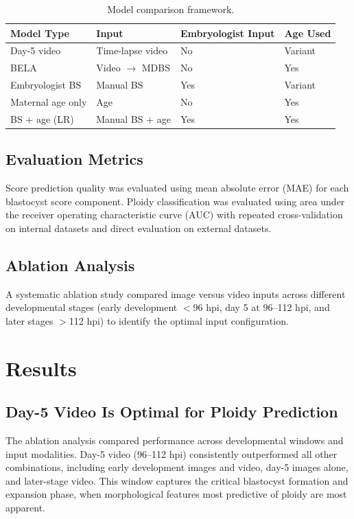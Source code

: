 \documentclass[11pt]{article}
\begin{document}
\begin{table}[htbp]
\centering
\caption{Model comparison framework.}
\label{tab:models}
\begin{tabular}{llll}
\toprule
Model Type & Input & Embryologist Input & Age Used \\
\midrule
Day-5 video & Time-lapse video & No & Variant \\
BELA & Video $\rightarrow$ MDBS & No & Yes \\
Embryologist BS & Manual BS & Yes & Variant \\
Maternal age only & Age & No & Yes \\
BS + age (LR) & Manual BS + age & Yes & Yes \\
\bottomrule
\end{tabular}
\end{table}

\subsection{Evaluation Metrics}

Score prediction quality was evaluated using mean absolute error (MAE) for each blastocyst score component. Ploidy classification was evaluated using area under the receiver operating characteristic curve (AUC) with repeated cross-validation on internal datasets and direct evaluation on external datasets.

\subsection{Ablation Analysis}

A systematic ablation study compared image versus video inputs across different developmental stages (early development $<$96 hpi, day 5 at 96--112 hpi, and later stages $>$112 hpi) to identify the optimal input configuration.

\section{Results}

\subsection{Day-5 Video Is Optimal for Ploidy Prediction}

The ablation analysis compared performance across developmental windows and input modalities. Day-5 video (96--112 hpi) consistently outperformed all other combinations, including early development images and video, day-5 images alone, and later-stage video. This window captures the critical blastocyst formation and expansion phase, when morphological features most predictive of ploidy are most apparent.
\end{document}

